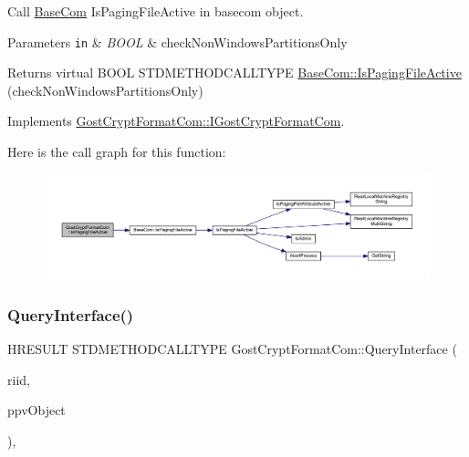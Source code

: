 Call \hyperlink{class_base_com}{Base\+Com} Is\+Paging\+File\+Active in basecom object. 


\begin{DoxyParams}[1]{Parameters}
\mbox{\tt in}  & {\em B\+O\+OL} & check\+Non\+Windows\+Partitions\+Only \\
\hline
\end{DoxyParams}
\begin{DoxyReturn}{Returns}
virtual B\+O\+OL S\+T\+D\+M\+E\+T\+H\+O\+D\+C\+A\+L\+L\+T\+Y\+PE \hyperlink{class_base_com_a41aa000a52c4c44d20b142c8868ef4ea}{Base\+Com\+::\+Is\+Paging\+File\+Active} (check\+Non\+Windows\+Partitions\+Only) 
\end{DoxyReturn}


Implements \hyperlink{interface_gost_crypt_format_com_1_1_i_gost_crypt_format_com}{Gost\+Crypt\+Format\+Com\+::\+I\+Gost\+Crypt\+Format\+Com}.

Here is the call graph for this function\+:
\nopagebreak
\begin{figure}[H]
\begin{center}
\leavevmode
\includegraphics[width=350pt]{class_gost_crypt_format_com_a267f14ce211adc772463ff5249da4bdc_cgraph}
\end{center}
\end{figure}
\mbox{\label{class_gost_crypt_format_com_a91c2843633f10496031609c27e248347}} 
\subsubsection{\texorpdfstring{Query\+Interface()}{QueryInterface()}}
{\footnotesize\ttfamily H\+R\+E\+S\+U\+LT S\+T\+D\+M\+E\+T\+H\+O\+D\+C\+A\+L\+L\+T\+Y\+PE Gost\+Crypt\+Format\+Com\+::\+Query\+Interface (\begin{DoxyParamCaption}\item[{R\+E\+F\+I\+ID}]{riid,  }\item[{void $\ast$$\ast$}]{ppv\+Object }\end{DoxyParamCaption})\hspace{0.3cm}{\ttfamily [inline]}, {\ttfamily [virtual]}}



